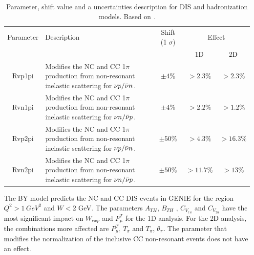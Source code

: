 \begin{table}[!htb]
    \centering
    \begin{tabular}{c|p{2.2in}|c|c|c}
        \hline 
        Parameter & Description & Shift (1 $\sigma$) & \multicolumn{2}{c}{Effect} \\
         & & & 1D & 2D \\
        \hline  
        Rvp1pi & Modifies the NC and CC 1$\pi$ production from non-resonant inelastic scattering for $\nu p/\Bar{\nu}n$. & $\pm4\%$ & $>2.3\%$ & $>2.3\%$\\ \hline
        Rvn1pi & Modifies the NC and CC 1$\pi$ production from non-resonant inelastic scattering for $\nu n/\Bar{\nu}p$. & $\pm4\%$ & $>2.2\%$ & $>1.2\%$\\ \hline
        Rvp2pi & Modifies the NC and CC 1$\pi$ production from non-resonant inelastic scattering for $\nu p/\Bar{\nu}n$. & $\pm50\%$ & $>4.3\%$ & $>16.3\%$\\ \hline
        Rvn2pi & Modifies the NC and CC 1$\pi$ production from non-resonant inelastic scattering for $\nu n/\Bar{\nu}p$. & $\pm50\%$ & $>11.7\%$ & $>13\%$\\ \hline
         
    \end{tabular}
    \caption{Parameter, shift value and a uncertainties description for DIS and hadronization models. Based on \cite{GENIEUnc}.}
    \label{tab:ErrorAnalysis:SystematicUnc:GenieNonRES}
\end{table}


The BY model predicts the NC and CC DIS events in GENIE for the region $Q^2 > 1\ GeV^2$ and $W<2$ GeV. The parameters $A_{TH}$, $B_{TH}$ , $C_{V_{1u}}$ and $C_{V_{2u}}$ have the most significant impact on $W_{exp}$ and $P^T_\mu$ for the 1D analysis. For the 2D analysis, the combinations more affected are $P^T_\mu$, $T_\pi$ and $T_\pi$, $\theta_\pi$. The parameter that modifies the normalization of the inclusive CC non-resonant events does not have an effect.

